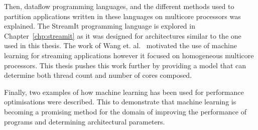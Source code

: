 Then, dataflow programming languages, and the different methods used to partition applications written in these languages on multicore processors was explained.
The StreamIt programming language is explored in Chapter~\ref{chp:streamit} as it was designed for architectures similar to the one used in this thesis.
The work of Wang et. al.~\cite{wang2013partitionstreamit} motivated the use of machine learning for streaming applications however it focused on homogeneous multicore processors.
This thesis pushes this work further by providing a model that can determine both thread count and number of cores composed.

Finally, two examples of how machine learning has been used for performance optimisations were described.
This to demonstrate that machine learning is becoming a promising method for the domain of improving the performance of programs and determining architectural parameters.
